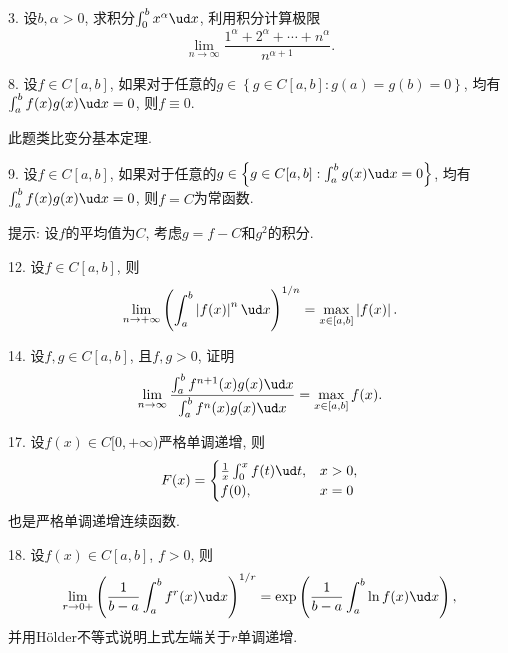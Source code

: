 3. 设$b,\alpha>0$, 求积分$\int_{0}^{b}x^{\alpha}\ud x$, 利用积分计算极限
\[
\lim_{n\to\infty}\frac{1^{\alpha}+2^{\alpha}+\cdots+n^{\alpha}}{n^{\alpha+1}}.
\]

8. 设$f\in C[a,b]$, 如果对于任意的$g\in\left\{ g\in C[a,b]:g(a)=g(b)=0\right\} $,
均有$\int_{a}^{b}f(x)g(x)\ud x=0$, 则$f\equiv0$.

此题类比变分基本定理.

9. 设$f\in C[a,b]$, 如果对于任意的$g\in\left\{ g\in C[a,b]:\int_{a}^{b}g(x)\ud x=0\right\} $,
均有$\int_{a}^{b}f(x)g(x)\ud x=0$, 则$f=C$为常函数.

提示: 设$f$的平均值为$C$, 考虑$g=f-C$和$g^{2}$的积分.

12. 设$f\in C[a,b]$, 则
\[
\lim_{n\to+\infty}\left(\int_{a}^{b}\left|f(x)\right|^{n}\ud x\right)^{1/n}=\max_{x\in[a,b]}\left|f(x)\right|.
\]

14. 设$f,g\in C[a,b]$, 且$f,g>0$, 证明
\[
\lim_{n\to\infty}\frac{\int_{a}^{b}f^{n+1}(x)g(x)\ud x}{\int_{a}^{b}f^{n}(x)g(x)\ud x}=\max_{x\in[a,b]}f(x).
\]

17. 设$f(x)\in C[0,+\infty)$严格单调递增, 则
\[
F(x)=\begin{cases}
	\frac{1}{x}\int_{0}^{x}f(t)\ud t, & x>0,\\
	f(0), & x=0
\end{cases}
\]
也是严格单调递增连续函数.

18. 设$f(x)\in C[a,b]$, $f>0$, 则
\[
\lim_{r\to0+}\left(\frac{1}{b-a}\int_{a}^{b}f^{r}(x)\ud x\right)^{1/r}=\exp\left(\frac{1}{b-a}\int_{a}^{b}\ln f(x)\ud x\right),
\]
并用H\"{o}lder不等式说明上式左端关于$r$单调递增.